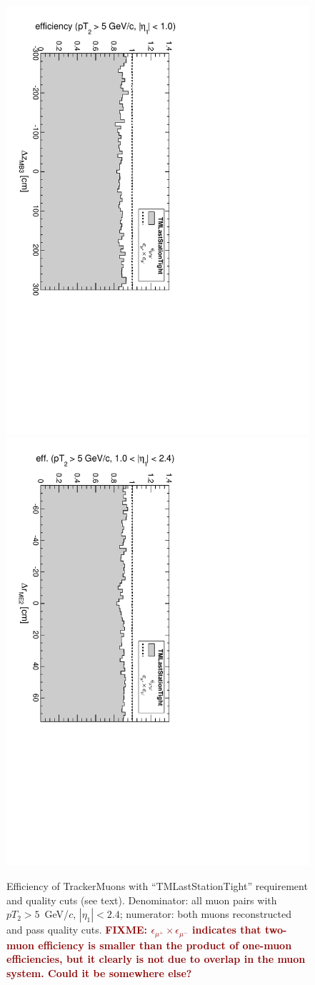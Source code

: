 \documentclass[12pt]{article}
\newcommand{\fixme}[1]{\textcolor{darkred}{\bf FIXME: #1}}
\begin{document}
\begin{figure}
\includegraphics[height=0.5\linewidth, angle=90]{fig/acceptance8_plot/vsmb3dz_TMLastStationTight.pdf}
\includegraphics[height=0.5\linewidth, angle=90]{fig/acceptance8_plot/vsme2dr_TMLastStationTight.pdf}

\caption{Efficiency of TrackerMuons with ``TMLastStationTight'' requirement and quality cuts (see text).  Denominator: all muon pairs with $pT_2 > 5$~GeV/$c$, $|\eta_1| < 2.4$; numerator: both muons reconstructed and pass quality cuts. \fixme{$\epsilon_{\mu^+} \times \epsilon_{\mu^-}$ indicates that two-muon efficiency is smaller than the product of one-muon efficiencies, but it clearly is not due to overlap in the muon system.  Could it be somewhere else?} \label{fig:efficiencies_TMLastStationTight}}
\end{figure}
\end{document}

